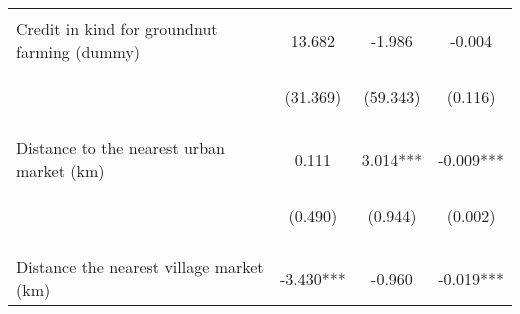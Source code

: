 \begin{center}
\begin{tabular}{lccc}
\vspace{4pt} & \begin{footnotesize}[0.969]\end{footnotesize} & \begin{footnotesize}[0.265]\end{footnotesize} & \begin{footnotesize}[0.438]\end{footnotesize} \\
Credit in kind for groundnut farming (dummy) & 13.682 & -1.986 & -0.004 \\
 & \begin{footnotesize}(31.369)\end{footnotesize} & \begin{footnotesize}(59.343)\end{footnotesize} & \begin{footnotesize}(0.116)\end{footnotesize} \\
\vspace{4pt} & \begin{footnotesize}[0.663]\end{footnotesize} & \begin{footnotesize}[0.973]\end{footnotesize} & \begin{footnotesize}[0.970]\end{footnotesize} \\
Distance to the nearest urban market (km) & 0.111 & 3.014*** & -0.009*** \\
 & \begin{footnotesize}(0.490)\end{footnotesize} & \begin{footnotesize}(0.944)\end{footnotesize} & \begin{footnotesize}(0.002)\end{footnotesize} \\
\vspace{4pt} & \begin{footnotesize}[0.821]\end{footnotesize} & \begin{footnotesize}[0.001]\end{footnotesize} & \begin{footnotesize}[0.000]\end{footnotesize} \\
Distance the nearest village market (km) & -3.430*** & -0.960 & -0.019*** \\

\end{tabular}
\end{center}
